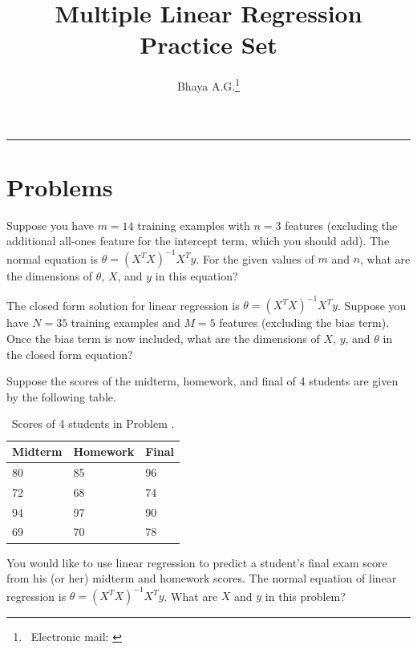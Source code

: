 \documentclass{article}
\title{Multiple Linear Regression Practice Set}
\author{Bhaya A.G.\thanks{\faEnvelope[regular]\ Electronic mail: \href{mailto:angubh.io@gmail.com}{\code{ananya[dot]gb[at]nbu[dot]ac[dot]in}}}}
\date{}
\newcounter{problem}
\begin{document}
	\maketitle
	
	\hrule
	
	\section*{Problems}
	
	\begin{problem}[3]
		Suppose you have \(m=14\) training examples with \(n=3\) features (excluding the additional all-ones feature for the intercept term, which you should add). The normal equation is \(\theta=(X^TX)^{-1}X^Ty\). For the given values of \(m\) and \(n\), what are the dimensions of \(\theta\), \(X\), and \(y\) in this equation?
	\end{problem}

	\begin{problem}[3]
		The closed form solution for linear regression is \(\theta=(X^TX)^{-1}X^Ty\). Suppose you have \(N=35\) training examples and \(M=5\) features (excluding the bias term). Once the bias term is now included, what are the dimensions of \(X\), \(y\), and \(\theta\) in the closed form equation?
	\end{problem}

	\begin{problem}[2]
		Suppose the scores of the midterm, homework, and final of 4 students are given by the following table.
		
		\begin{table}[ht]
			\centering
			\begin{tabularx}{0.5\textwidth}{|X | X | X|}
				\hline
				\textbf{Midterm} & \textbf{Homework} & \textbf{Final} \\
				\hline
				80 & 85 & 96\\
				72 & 68 & 74\\
				94 & 97 & 90\\
				69 & 70 & 78\\
				\hline
			\end{tabularx}
		\caption{Scores of 4 students in Problem \theproblem.}
		\end{table}
	
	You would like to use linear regression to predict a student's final exam score from his (or her) midterm and homework scores. The normal equation of linear regression is \(\theta=(X^TX)^{-1}X^Ty\). What are \(X\) and \(y\) in this problem?
	\end{problem}
\end{document}
